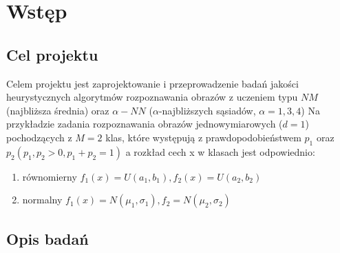 \section{Wstęp}
	\subsection{Cel projektu}
	

	Celem projektu jest zaprojektowanie i przeprowadzenie badań jakości heurystycznych algorytmów rozpoznawania obrazów z uczeniem typu $NM$  (najbliższa średnia) oraz $\alpha-NN$ ($\alpha$-najbliższych sąsiadów, $ \alpha=1,3,4$) Na przykładzie zadania rozpoznawania obrazów jednowymiarowych ($d=1$) pochodzących z $M = 2$ klas, które występują z prawdopodobieństwem $p_1$ oraz $p_2 (p_1,p_2>0, p_1+p_2=1)$ a rozkład cech x w klasach jest odpowiednio:
	\begin{enumerate}
	\item równomierny $f_1(x)=U(a_1,b_1), f_2(x)=U(a_2,b_2)$
	\item normalny $f_1(x)=N(\mu_1, \sigma_1), f_2=N(\mu_2, \sigma_2)$
	\end{enumerate}
	
	\subsection{Opis badań}
	